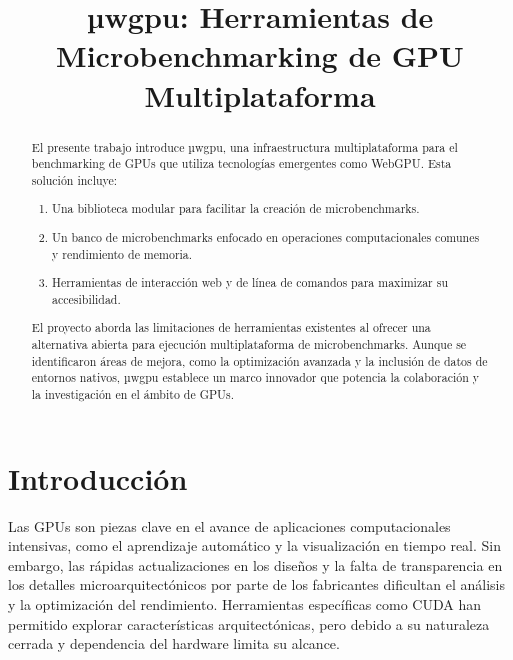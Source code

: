 \documentclass[conference]{IEEEtran}
\title{µwgpu: Herramientas de Microbenchmarking de GPU Multiplataforma}
\author{\IEEEauthorblockN{Ignacio Vargas Campos}
\IEEEauthorblockA{\textit{Ingeniería en Computadores} \\
\textit{Instituto Tecnológico de Costa Rica}\\
Cartago, Costa Rica \\
ignacio.vargas@estudiantec.cr}
}
\begin{document}

\maketitle
\thispagestyle{plain}

\begin{abstract}

El presente trabajo introduce µwgpu, una infraestructura multiplataforma para
el benchmarking de GPUs que utiliza tecnologías emergentes como WebGPU. Esta
solución incluye:

\begin{enumerate}
  \item Una biblioteca modular para facilitar la creación de microbenchmarks.
  \item Un banco de microbenchmarks enfocado en operaciones computacionales comunes y rendimiento de memoria.
  \item Herramientas de interacción web y de línea de comandos para maximizar su accesibilidad.
\end{enumerate}

El proyecto aborda las limitaciones de herramientas existentes al ofrecer una
alternativa abierta para ejecución multiplataforma de microbenchmarks. Aunque
se identificaron áreas de mejora, como la optimización avanzada y la
inclusión de datos de entornos nativos, µwgpu establece un marco innovador
que potencia la colaboración y la investigación en el ámbito de GPUs.

\end{abstract}

\section{Introducción}

Las GPUs son piezas clave en el avance de aplicaciones computacionales intensivas, como el aprendizaje automático y la visualización en tiempo real. Sin embargo, las rápidas actualizaciones en los diseños y la falta de transparencia en los detalles microarquitectónicos por parte de los fabricantes dificultan el análisis y la optimización del rendimiento. Herramientas específicas como CUDA han permitido explorar características arquitectónicas, pero debido a su naturaleza cerrada y dependencia del hardware limita su alcance.
\end{document}
